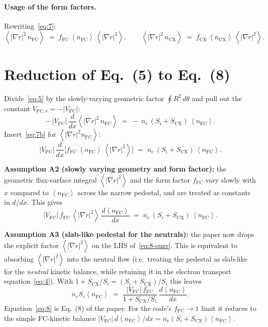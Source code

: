 \documentclass[11pt]{article}
\renewcommand{\ne}{n_{e}}  %
\newcommand{\nfc}{n_{\mathrm{FC}}}
\newcommand{\ncx}{n_{\mathrm{CX}}}
\newcommand{\Vfc}{\lvert V_{\mathrm{FC}}\rvert}
\newcommand{\Vfcr}{V_{\mathrm{FC},r}}
\newcommand{\Si}{S_{i}}
\newcommand{\Scx}{S_{\mathrm{CX}}}
\newcommand{\fFC}{f_{\mathrm{FC}}}
\newcommand{\fCX}{f_{\mathrm{CX}}}
\newcommand{\fsa}[1]{\left\langle #1 \right\rangle}
\newcommand{\gradrsq}{\fsa{|\nabla r|^{2}}}
\begin{document}
\paragraph{Usage of the form factors.}
Rewriting~\eqref{eq:7}:
\begin{equation}
  \fsa{|\nabla r|^{2}\,\nfc} \;=\; \fFC\,\fsa{\nfc}\,\gradrsq,
  \qquad
  \fsa{|\nabla r|^{2}\,\ncx} \;=\; \fCX\,\fsa{\ncx}\,\gradrsq.
  \label{eq:7b}
\end{equation}

\section{Reduction of Eq.~(5) to Eq.~(8)}
\label{sec:eq-8}

Divide~\eqref{eq:5} by the slowly-varying geometric factor
$\oint R^{2}\,d\theta$ and pull out the constant $\Vfcr=-\Vfc$:
\begin{equation}
  -\,\Vfc\,\frac{d}{dx}\fsa{|\nabla r|^{2}\,\nfc}
    \;=\; -\,\ne\,(\Si+\Scx)\,\fsa{\nfc}.
\end{equation}
Insert~\eqref{eq:7b} for $\fsa{|\nabla r|^{2}\nfc}$:
\begin{equation}
  \Vfc\,\frac{d}{dx}\!\bigl[\fFC\,\fsa{\nfc}\,\gradrsq\bigr]
    \;=\; \ne\,(\Si+\Scx)\,\fsa{\nfc}.
\end{equation}

\textbf{Assumption A2 (slowly varying geometry and form factor):} the
geometric flux-surface integral $\gradrsq$ and the form factor $\fFC$ vary
slowly with $x$ compared to $\fsa{\nfc}$ across the narrow pedestal, and
are treated as constants in $d/dx$.  This gives
\begin{equation}
  \Vfc\,\fFC\,\gradrsq\,\frac{d\fsa{\nfc}}{dx}
    \;=\; \ne\,(\Si+\Scx)\,\fsa{\nfc}.
  \label{eq:8-ours}
\end{equation}

\textbf{Assumption A3 (slab-like pedestal for the neutrals):} the paper now
drops the explicit factor $\gradrsq$ on the LHS of~\eqref{eq:8-ours}.  This
is equivalent to absorbing $\gradrsq$ into the neutral flow (i.e.\ treating
the pedestal as slab-like for the \emph{neutral} kinetic balance, while
retaining it in the electron transport equation~\eqref{eq:4}).  With
$1+\Scx/\Si = (\Si+\Scx)/\Si$ this leaves
\begin{equation}
  \boxed{\;
    \ne\Si\fsa{\nfc} \;=\; \frac{\Vfc\,\fFC}{1 + \Scx/\Si}\,\frac{d\fsa{\nfc}}{dx}.
  \;}
  \label{eq:8}
\end{equation}
Equation~\eqref{eq:8} is Eq.~(8) of the paper.  For the code's
$\fFC\to 1$ limit it reduces to the simple FC-kinetic balance
$\Vfc\,d\fsa{\nfc}/dx = \ne(\Si+\Scx)\fsa{\nfc}$.
\end{document}
